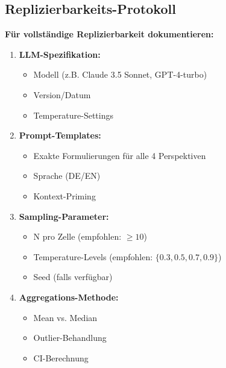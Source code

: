 \subsection{Replizierbarkeits-Protokoll}

\begin{tcolorbox}[colback=green!5!white, colframe=green!75!black,
    title=\textbf{Protokoll HHH-LLMMC-3: Standardisierte Replikation}]

\textbf{Für vollständige Replizierbarkeit dokumentieren:}

\begin{enumerate}[nosep]
    \item \textbf{LLM-Spezifikation:}
    \begin{itemize}[nosep]
        \item Modell (z.B. Claude 3.5 Sonnet, GPT-4-turbo)
        \item Version/Datum
        \item Temperature-Settings
    \end{itemize}

    \item \textbf{Prompt-Templates:}
    \begin{itemize}[nosep]
        \item Exakte Formulierungen für alle 4 Perspektiven
        \item Sprache (DE/EN)
        \item Kontext-Priming
    \end{itemize}

    \item \textbf{Sampling-Parameter:}
    \begin{itemize}[nosep]
        \item N pro Zelle (empfohlen: $\geq 10$)
        \item Temperature-Levels (empfohlen: $\{0.3, 0.5, 0.7, 0.9\}$)
        \item Seed (falls verfügbar)
    \end{itemize}

    \item \textbf{Aggregations-Methode:}
    \begin{itemize}[nosep]
        \item Mean vs. Median
        \item Outlier-Behandlung
        \item CI-Berechnung
    \end{itemize}


\end{enumerate}
\end{tcolorbox}
